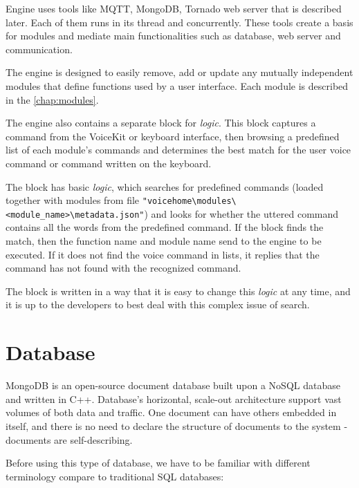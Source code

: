 Engine uses tools like MQTT, MongoDB, Tornado web server that is described later. Each of them runs in its thread and concurrently. These tools create a basis for modules and mediate main functionalities such as database, web server and communication. 

The engine is designed to easily remove, add or update any mutually independent modules that define functions used by a user interface. Each module is described in the \cref{chap:modules}.

The engine also contains a separate block for \textit{logic}. This block captures a command from the VoiceKit or keyboard interface, then browsing a predefined list of each module's commands and determines the best match for the user voice command or command written on the keyboard.

The block has basic \textit{logic}, which searches for predefined commands (loaded together with modules from file \texttt{"voicehome\textbackslash modules\textbackslash <module\_name>\textbackslash metadata.json"}) and looks for whether the uttered command contains all the words from the predefined command. If the block finds the match, then the function name and module name send to the engine to be executed. If it does not find the voice command in lists, it replies that the command has not found with the recognized command.

The block is written in a way that it is easy to change this \textit{logic} at any time, and it is up to the developers to best deal with this complex issue of search.

\section{Database} \label{section:database}

MongoDB is an open-source document database built upon a NoSQL database and written in C++. Database's horizontal, scale-out architecture support vast volumes of both data and traffic. One document can have others embedded in itself, and there is no need to declare the structure of documents to the system - documents are self-describing.\citep{mongoDB_jayaram_2020}

Before using this type of database, we have to be familiar with different terminology compare to traditional SQL databases: 

